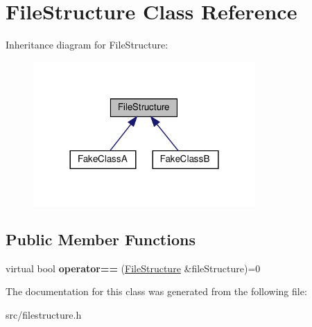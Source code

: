 \hypertarget{classFileStructure}{}\section{File\+Structure Class Reference}
\label{classFileStructure}


Inheritance diagram for File\+Structure\+:
\nopagebreak
\begin{figure}[H]
\begin{center}
\leavevmode
\includegraphics[width=240pt]{classFileStructure__inherit__graph}
\end{center}
\end{figure}
\subsection*{Public Member Functions}
\begin{DoxyCompactItemize}
\item 
\mbox{\label{classFileStructure_a5ca47e505fb741939fe0a140730dfbc0}} 
virtual bool {\bfseries operator==} (\hyperlink{classFileStructure}{File\+Structure} \&file\+Structure)=0
\end{DoxyCompactItemize}


The documentation for this class was generated from the following file\+:\begin{DoxyCompactItemize}
\item 
src/filestructure.\+h\end{DoxyCompactItemize}
